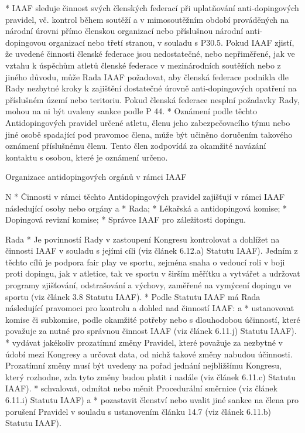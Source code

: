 * IAAF sleduje činnost svých členských federací při uplatňování anti-dopingových pravidel, vč. kontrol během soutěží a v mimosoutěžním období prováděných na národní úrovni přímo členskou organizací nebo příslušnou národní anti-dopingovou organizací nebo třetí stranou, v souladu s P30.5. Pokud IAAF zjistí, že uvedené činnosti členské federace jsou nedostatečné, nebo nepřiměřené, jak ve vztahu k úspěchům atletů členské federace v mezinárodních soutěžích nebo z jiného důvodu, může Rada IAAF požadovat, aby členská federace podnikla dle Rady nezbytné kroky k zajištění dostatečné úrovně anti-dopingových opatření na příslušném území nebo teritoriu. Pokud členská federace nesplní požadavky Rady, mohou na ni být uvaleny sankce podle P 44.
* Oznámení podle těchto Antidopingových pravidel určené atletu, členu jeho zabezpečovacího týmu nebo jiné osobě spadající pod pravomoc člena, může být učiněno doručením takového oznámení příslušnému členu. Tento člen zodpovídá za okamžité navázání kontaktu s osobou, které je oznámení určeno.
\enditems

\secc Organizace antidopingových orgánů v rámci IAAF

\begitems \style N
* Činnosti v rámci těchto Antidopingových pravidel zajišťují v rámci IAAF následující osoby nebo orgány
  \begitems \style a
  * Rada;
  * Lékařská a antidopingová komise;
  * Dopingová revizní komise;
  * Správce IAAF pro záležitosti dopingu.
  \enditems

Rada
* Je povinností Rady v zastoupení Kongresu kontrolovat a dohlížet na činnosti IAAF v souladu s jejími cíli (viz článek 6.12.a) Statutu IAAF). Jedním z těchto cílů je podpora fair play ve sportu, zejména snaha o vedoucí roli v boji proti dopingu, jak v atletice, tak ve sportu v širším měřítku a vytvářet a udržovat programy zjišťování, odstrašování a výchovy, zaměřené na vymýcení dopingu ve sportu (viz článek 3.8 Statutu IAAF).
* Podle Statutu IAAF má Rada následující pravomoci pro kontrolu a dohled nad činností IAAF:
  \begitems \style a
  * ustanovovat komise či subkomise, podle okamžité potřeby nebo s dlouhodobou účinností, které považuje za nutné pro správnou činnost IAAF (viz článek 6.11.j) Statutu IAAF).
  * vydávat jakékoliv prozatímní změny Pravidel, které považuje za nezbytné v údobí mezi Kongresy a určovat data, od nichž takové změny nabudou účinnosti. Prozatímní změny musí být uvedeny na pořad jednání nejbližšímu Kongresu, který rozhodne, zda  tyto změny budou platit i nadále (viz článek 6.11.c) Statutu IAAF).
  * schvalovat, odmítat nebo měnit Procedurální směrnice (viz článek 6.11.i) Statutu IAAF) a
  * pozastavit členství nebo uvalit jiné sankce na člena pro porušení Pravidel v souladu s ustanovením článku 14.7 (viz článek 6.11.b) Statutu IAAF).
  \enditems

